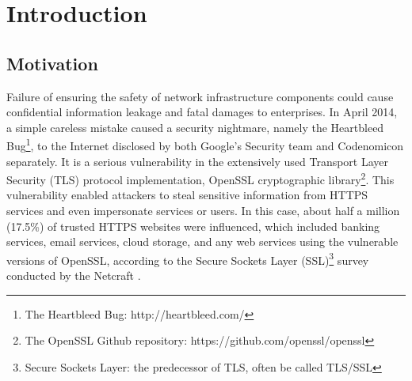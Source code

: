 
\chapter{Introduction}

\section{Motivation} \label{sec:heartbleed bug}
Failure of ensuring the safety of network infrastructure components could cause confidential information leakage and fatal damages to enterprises. In April 2014, a simple careless mistake caused a security nightmare, namely the Heartbleed Bug\footnote{The Heartbleed Bug: http://heartbleed.com/}, to the Internet disclosed by both Google's Security team and Codenomicon separately. It is a serious vulnerability in the extensively used Transport Layer Security (TLS) protocol implementation, OpenSSL cryptographic library\footnote{The OpenSSL Github repository: https://github.com/openssl/openssl}. This vulnerability enabled attackers to steal sensitive information from HTTPS services and even impersonate services or users. In this case, about half a million (17.5\%) of trusted HTTPS websites were influenced, which included banking services, email services, cloud storage, and any web services using the vulnerable versions of OpenSSL, according to the Secure Sockets Layer (SSL)\footnote{Secure Sockets Layer: the predecessor of TLS, often be called TLS/SSL} survey conducted by the Netcraft \cite{9_heartbleed}.

